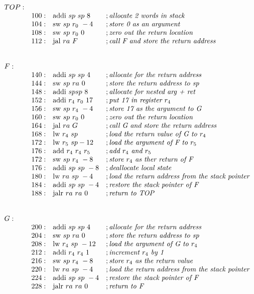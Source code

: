 \documentclass[acmsmall,review,anonymous]{acmart}\settopmatter{printfolios=true,printccs=false,printacmref=false}
\begin{document}
\newcommand*{\instr}[3]{ & #1: & #2 & ; \text{\em #3}\\}
\newcommand*{\clabel}[1]{#1: & & &\\}
\newcommand*{\rsp}{sp}
\newcommand*{\rra}{ra}
\[
\begin{array}{llll}
  \clabel{TOP}
  \instr{100}{\addi ~ \rsp ~ \rsp ~ 8}{allocate 2 words in stack}
  \instr{104}{\sw ~ \rsp ~ r_0 ~ -4}{store 0 as an argument}
  \instr{108}{\sw ~ \rsp ~ r_0 ~ 0}{zero out the return location}
  \instr{112}{\jal ~ \rra ~ F}{call F and store the return address}
  & & & \\
  & & & \\
  \clabel{F}
  \instr{140}{\addi ~ \rsp ~ \rsp ~ 4}{allocate for the return address}
  \instr{144}{\sw ~ \rsp ~ \rra ~ 0}{store the return address to sp}
  \instr{148}{\addi ~ \rsp \rsp ~ 8}{allocate for nested arg + ret}
  \instr{152}{\addi ~ r_4 ~ r_0 ~ 17}{put 17 in register $r_4$}
  \instr{156}{\sw ~ \rsp ~ r_4 ~ -4}{store 17 as the argument to G}
  \instr{160}{\sw ~ \rsp ~ r_0 ~ 0}{zero out the return location}
  \instr{164}{\jal ~ \rra ~ G}{call G and store the return address}
  \instr{168}{\lw ~ r_4 ~ \rsp}{load the return value of G to $r_4$}
  \instr{172}{\lw ~ r_5 ~ \rsp -12}{load the argument of F to $r_5$}
  \instr{176}{\add ~ r_4 ~ r_4 ~ r_5}{add $r_4$ and $r_5$}
  \instr{172}{\sw ~ \rsp ~ r_4 ~ -8}{store $r_4$ as ther return of F}
  \instr{176}{\addi ~ \rsp ~ \rsp ~ -8}{deallocate local state}
  \instr{180}{\lw ~ \rra ~ \rsp ~ -4}{load the return address from the stack pointer}
  \instr{184}{\addi ~ \rsp ~ \rsp ~ -4}{restore the stack pointer of F}
  \instr{188}{\jalr ~ \rra ~ \rra ~ 0}{return to TOP}
  & & & \\
  & & & \\
  \clabel{G}
  \instr{200}{\addi ~ \rsp ~ \rsp ~ 4}{allocate for the return address}
  \instr{204}{\sw ~ \rsp ~ \rra ~ 0}{store the return address to sp}
  \instr{208}{\lw ~ r_4 ~ \rsp ~ -12}{load the argument of G to $r_4$}
  \instr{212}{\addi ~ r_4 ~ r_4 ~ 1}{increment $r_4$ by 1}
  \instr{216}{\sw ~ \rsp ~ r_4 ~ -8}{store $r_4$ as the return value}
  \instr{220}{\lw ~ \rra ~ \rsp ~ -4}{load the return address from the stack pointer}
  \instr{224}{\addi ~ \rsp ~ \rsp ~ -4}{restore the stack pointer of F}
  \instr{228}{\jalr ~ \rra ~ \rra ~ 0}{return to F}


\end{array}
\]
\end{document}
